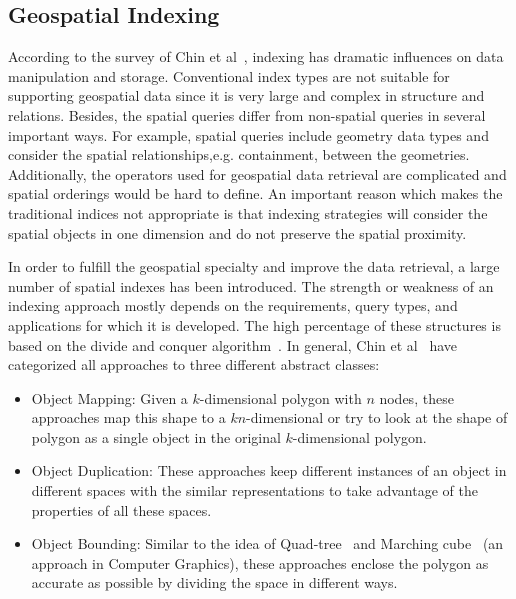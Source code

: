 \documentclass[a4paper,12pt]{article}
\begin{document}
\subsection{Geospatial Indexing}
\label{s.geospatial-index}
According to the survey of Chin et al~\cite{survey}, indexing has dramatic influences on data manipulation and storage. Conventional index types are not suitable for supporting geospatial data since it is very large and complex in structure and relations. Besides, the spatial queries differ from non-spatial queries in several important ways. For example, spatial queries include geometry data types and consider the spatial relationships,e.g. containment, between the geometries. Additionally, the operators used for geospatial data retrieval are complicated and spatial orderings would be hard to define. An important reason which makes the traditional indices not appropriate is that indexing strategies will consider the spatial objects in one dimension and do not preserve the spatial proximity.

In order to fulfill the geospatial specialty and improve the data retrieval, a large number of spatial indexes has been introduced. The strength or weakness of an indexing approach mostly depends on the requirements, query types, and applications for which it is developed. 
The high percentage of these structures is based on the divide and conquer algorithm~\cite{divconquer}. 
In general, Chin et al~\cite{survey} have categorized all approaches to three different abstract classes:
\begin{itemize}
\item Object Mapping: Given a $k$-dimensional polygon with $n$ nodes, these approaches map this shape to a $kn$-dimensional or try to look at the shape of polygon as a single object in the original $k$-dimensional polygon.   
\item Object Duplication: These approaches keep different instances of an object in different spaces with the similar representations to take advantage of the properties of all these spaces. 
\item Object Bounding: Similar to the idea of Quad-tree~\cite{quadtree} and Marching cube~\cite{marchingcube} (an approach in Computer Graphics), 
these approaches enclose the polygon as accurate as possible by dividing the space in different ways. 
\end{itemize}
\end{document}
